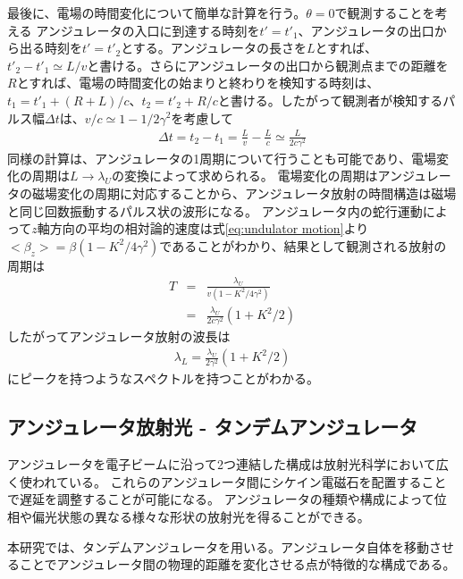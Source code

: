 \documentclass[a4paper,11pt,uplatex]{jsbook}
\begin{document}
最後に、電場の時間変化について簡単な計算を行う。$\theta = 0$で観測することを考える
アンジュレータの入口に到達する時刻を$t' = t'_1 $、アンジュレータの出口から出る時刻を$t' = t'_2$とする。アンジュレータの長さを$L$とすれば、
$t'_2 - t'_1 \simeq L / v$と書ける。さらにアンジュレータの出口から観測点までの距離を$R$とすれば、電場の時間変化の始まりと終わりを検知する時刻は、
$t_1 = t'_1 + (R + L)/c$、$t_2 = t'_2 + R/c$と書ける。したがって観測者が検知するパルス幅$\Delta t$は、$v/c \simeq 1- 1/2\gamma^2$を考慮して
\begin{eqnarray}
  \Delta t = t_2 - t_1 = \frac{L}{v}  - \frac{L}{c} \simeq \frac{L}{2c\gamma^2}
\end{eqnarray}
同様の計算は、アンジュレータの1周期について行うことも可能であり、電場変化の周期は$L\rightarrow \lambda_U$の変換によって求められる。
電場変化の周期はアンジュレータの磁場変化の周期に対応することから、アンジュレータ放射の時間構造は磁場と同じ回数振動するパルス状の波形になる。
アンジュレータ内の蛇行運動によって$z$軸方向の平均の相対論的速度は式\ref{eq:undulator motion}より$<\beta_z> =\beta (1-K^2/4\gamma^2)$であることがわかり、結果として観測される放射の周期は
\begin{eqnarray}
  T &=& \frac{\lambda_U}{v(1-K^2/4\gamma^2)} \\
  &=& \frac{\lambda_U}{2c\gamma^2}(1 + K^2/2)
\end{eqnarray}
したがってアンジュレータ放射の波長は
\begin{eqnarray}
  \lambda_L = \frac{\lambda_U}{2\gamma^2}(1+K^2/2)
\end{eqnarray}\label{eq:resonance_wl}
にピークを持つようなスペクトルを持つことがわかる。

\subsection{アンジュレータ放射光 - タンデムアンジュレータ}\label{sec:tandem}
アンジュレータを電子ビームに沿って2つ連結した構成は放射光科学において広く使われている。
これらのアンジュレータ間にシケイン電磁石を配置することで遅延を調整することが可能になる。
アンジュレータの種類や構成によって位相や偏光状態の異なる様々な形状の放射光を得ることができる。

本研究では、タンデムアンジュレータを用いる。アンジュレータ自体を移動させることでアンジュレータ間の物理的距離を変化させる点が特徴的な構成である。
\end{document}
